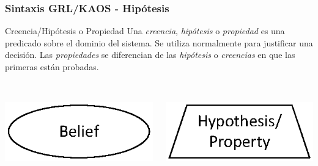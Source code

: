 \documentclass[handout,slidestop,xcolor=pst,dvips,blue]{beamer}
\begin{document}
\begin{frame}[c]
    \frametitle{Sintaxis GRL/KAOS - Hipótesis}
    \begin{block}{Creencia/Hipótesis o Propiedad}
        Una \alert{\emph{creencia}}, \alert{\emph{hipótesis}} o \alert{\emph{propiedad}} es una predicado sobre el dominio del sistema. Se utiliza normalmente para justificar una decisión. Las \emph{propiedades} se diferencian de las \emph{hipótesis} o \emph{creencias} en que las primeras están probadas.
        \ \\
        \ \\
        \begin{columns}[c]
            \begin{column}{0.50\linewidth}
                \centering \includegraphics[width=0.5\columnwidth,keepaspectratio=true]{images/objetivos/belief(GRL).eps}
            \end{column}
            \begin{column}{0.50\linewidth}
                \centering \includegraphics[width=0.5\columnwidth,keepaspectratio=true]{images/objetivos/hypothesis(KAOS).eps}
            \end{column}
        \end{columns}
    \end{block}
\end{frame}
\end{document}
